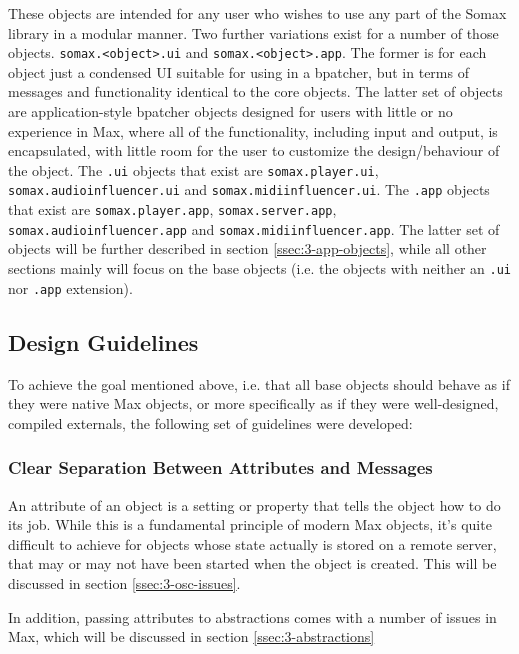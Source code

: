 \noindent These objects are intended for any user who wishes to use any part of the Somax library in a modular manner. Two further variations exist for a number of those objects. \texttt{somax.<object>.ui} and \texttt{somax.<object>.app}. The former is for each object just a condensed UI suitable for using in a bpatcher, but in terms of messages and functionality identical to the core objects. The latter set of objects are application-style bpatcher objects designed for users with little or no experience in Max, where all of the functionality, including input and output, is encapsulated, with little room for the user to customize the design/behaviour of the object. The \texttt{.ui} objects that exist are \texttt{somax.player.ui}, \texttt{somax.audioinfluencer.ui} and \texttt{somax.midiinfluencer.ui}. The \texttt{.app} objects that exist are \texttt{somax.player.app}, \texttt{somax.server.app}, \texttt{somax.audioinfluencer.app} and \texttt{somax.midiinfluencer.app}. The latter set of objects will be further described in section \ref{ssec:3-app-objects}, while all other sections mainly will focus on the base objects (i.e. the objects with neither an \texttt{.ui} nor \texttt{.app} extension).



\subsection{Design Guidelines}\label{ssec:3-design-guidelines}
To achieve the goal mentioned above, i.e. that all base objects should behave as if they were native Max objects, or more specifically as if they were well-designed, compiled externals, the following set of guidelines were developed:

\subsubsection{Clear Separation Between Attributes and Messages}
An attribute of an object is a setting or property that tells the object how to do its job. While this is a fundamental principle of modern Max objects, it's quite difficult to achieve for objects whose state actually is stored on a remote server, that may or may not have been started when the object is created. This will be discussed in section \ref{ssec:3-osc-issues}.

In addition, passing attributes to abstractions comes with a number of issues in Max, which will be discussed in section \ref{ssec:3-abstractions}

